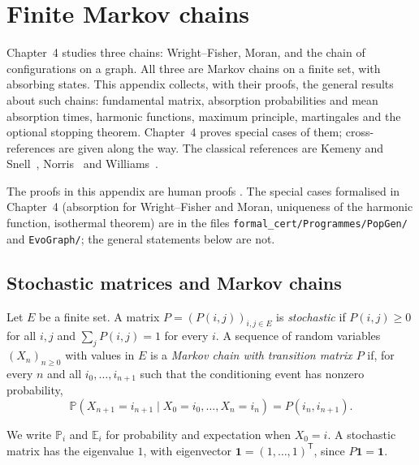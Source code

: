 \chapter{Finite Markov chains}\label{appB:chap}

Chapter~4 studies three chains: Wright--Fisher, Moran, and the chain of configurations on a graph. All three
are Markov chains on a finite set, with absorbing states. This appendix collects, with their proofs, the general
results about such chains: fundamental matrix, absorption probabilities and mean absorption times, harmonic
functions, maximum principle, martingales and the optional stopping theorem. Chapter~4 proves special cases of them;
cross-references are given along the way. The classical references are Kemeny and
Snell~\cite{ch4:KS}, Norris~\cite{app:norris} and Williams~\cite{app:williams}.

\begin{warnbox}[: tiers]
The proofs in this appendix are human proofs \tierC. The special cases formalised in
Chapter~4 (absorption for Wright--Fisher and Moran, uniqueness of the harmonic function, isothermal theorem) are
\tierA{} in the files \texttt{formal\_cert/Programmes/PopGen/} and \texttt{EvoGraph/}; the general statements
below are not.
\end{warnbox}

\section{Stochastic matrices and Markov chains}\label{appB:sec:def}

\begin{definition}
Let $E$ be a finite set. A matrix $P=(P(i,j))_{i,j\in E}$ is \emph{stochastic} if $P(i,j)\ge0$ for all $i,j$
and $\sum_jP(i,j)=1$ for every $i$. A sequence of random variables $(X_n)_{n\ge0}$ with values in $E$ is a
\emph{Markov chain with transition matrix $P$} if, for every $n$ and all $i_0,\dots,i_{n+1}$ such that the conditioning
event has nonzero probability,
\[\mathbb P(X_{n+1}=i_{n+1}\mid X_0=i_0,\dots,X_n=i_n)=P(i_n,i_{n+1}) .\]
\end{definition}
We write $\mathbb P_i$ and $\mathbb E_i$ for probability and expectation when $X_0=i$. A stochastic matrix has the
eigenvalue $1$, with eigenvector $\mathbf 1=(1,\dots,1)^{\mathsf T}$, since $P\mathbf 1=\mathbf 1$.

